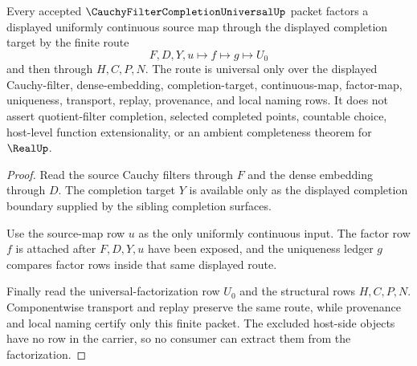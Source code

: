 \begin{theorem}
\label{thm:cauchy-filter-completion-universal-factorization}
Every accepted $\CauchyFilterCompletionUniversalUp$ packet factors a displayed uniformly continuous source map through the displayed completion target by the finite route
$$
F,D,Y,u \longmapsto f \longmapsto g \longmapsto U_0
$$
and then through $H,C,P,N$. The route is universal only over the displayed Cauchy-filter, dense-embedding, completion-target, continuous-map, factor-map, uniqueness, transport, replay, provenance, and local naming rows. It does not assert quotient-filter completion, selected completed points, countable choice, host-level function extensionality, or an ambient completeness theorem for $\RealUp$.
\end{theorem}
\begin{proof}
Read the source Cauchy filters through $F$ and the dense embedding through $D$. The completion target $Y$ is available only as the displayed completion boundary supplied by the sibling completion surfaces.

Use the source-map row $u$ as the only uniformly continuous input. The factor row $f$ is attached after $F,D,Y,u$ have been exposed, and the uniqueness ledger $g$ compares factor rows inside that same displayed route.

Finally read the universal-factorization row $U_0$ and the structural rows $H,C,P,N$. Componentwise transport and replay preserve the same route, while provenance and local naming certify only this finite packet. The excluded host-side objects have no row in the carrier, so no consumer can extract them from the factorization.
\end{proof}

\begin{closurestatus}{\CauchyFilterCompletionUniversalUp}
  \theoryclosure{\seedClosure}
  \formalstatus{\formalTargetV}
\end{closurestatus}
